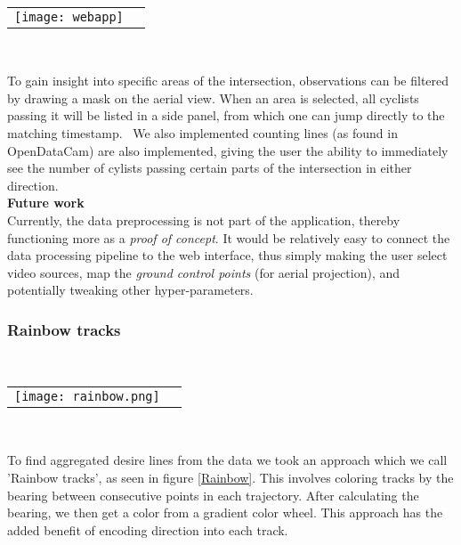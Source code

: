 \ \\ 
\raggedbottom
\begin{tabular}{@{}cc}
\texttt{[image: webapp]} 
\end{tabular}
\label{webapp}
\

To gain insight into specific areas of the intersection, observations can be filtered by drawing a mask on the aerial view. 
When an area is selected, all cyclists passing it will be listed in a side panel, from which one can jump directly to the matching timestamp.
\
We also implemented counting lines (as found in OpenDataCam) are also implemented, giving the user the ability to immediately see the number of 
cylists passing certain parts of the intersection in either direction.
\ \\

\textbf{Future work} \\
Currently, the data preprocessing is not part of the application, thereby functioning more as a \textit{proof of concept}.
It would be relatively easy to connect the data processing pipeline to the web interface, thus simply making the user 
select video sources, map the \textit{ground control points} (for aerial projection), and potentially tweaking other hyper-parameters. 

\subsubsection{Rainbow tracks}

\ \\ 
\noindent
\begin{tabular}{@{}cc}
\texttt{[image: rainbow.png]} 
\end{tabular}
\label{Rainbow}
\

To find aggregated desire lines from the data we took an approach which we call 'Rainbow tracks', as
seen in figure \ref{Rainbow}. 
This involves coloring tracks by the bearing between consecutive points in each trajectory. 
After calculating the bearing, we then get a color from a gradient color wheel. 
This approach has the added benefit of encoding direction into each track.
\ \\ 


